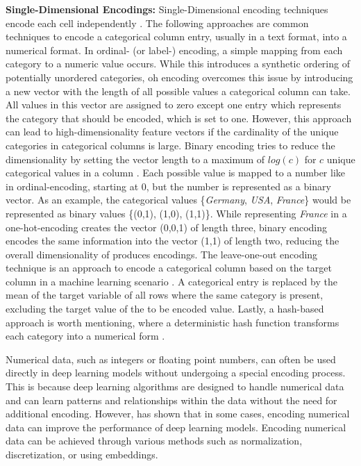 \textbf{Single-Dimensional Encodings:}
Single-Dimensional encoding techniques encode each cell independently \cite{borisov2022DeepNeuralNetworks}.
The following approaches are common techniques to encode a categorical column entry, usually in a text format, into a numerical format.
In ordinal- (or label-) encoding, a simple mapping from each category to a numeric value occurs. 
While this introduces a synthetic ordering of potentially unordered categories, \gls{oh} encoding overcomes this issue by introducing a new vector with the length of all possible values a categorical column can take.
All values in this vector are assigned to zero except one entry which represents the category that should be encoded, which is set to one.
However, this approach can lead to high-dimensionality feature vectors if the cardinality of the unique categories in categorical columns is large.
Binary encoding tries to reduce the dimensionality by setting the vector length to a maximum of $log(c)$ for $c$ unique categorical values in a column \cite{borisov2022DeepNeuralNetworks}.
Each possible value is mapped to a number like in ordinal-encoding, starting at 0, but the number is represented as a binary vector.
As an example, the categorical values \{\textit{Germany}, \textit{USA}, \textit{France}\} would be represented as binary values \{(0,1), (1,0), (1,1)\}. 
While representing \textit{France} in a one-hot-encoding creates the vector (0,0,1) of length three, binary encoding encodes the same information into the vector (1,1) of length two, reducing the overall dimensionality of produces encodings.
The leave-one-out encoding technique is an approach to encode a categorical column based on the target column in a machine learning scenario \cite{borisov2022DeepNeuralNetworks}. 
A categorical entry is replaced by the mean of the target variable of all rows where the same category is present, excluding the target value of the to be encoded value.
Lastly, a hash-based approach is worth mentioning, where a deterministic hash function transforms each category into a numerical form \cite{borisov2022DeepNeuralNetworks}.

Numerical data, such as integers or floating point numbers, can often be used directly in deep learning models without undergoing a special encoding process. 
This is because deep learning algorithms are designed to handle numerical data and can learn patterns and relationships within the data without the need for additional encoding.
However, \cite{gorishniy2022EmbeddingsNumericalFeatures} has shown that in some cases, encoding numerical data can improve the performance of deep learning models. 
Encoding numerical data can be achieved through various methods such as normalization, discretization, or using embeddings.

